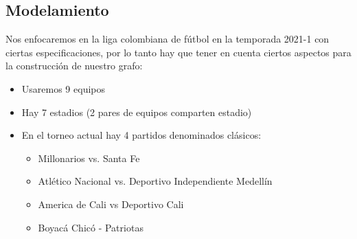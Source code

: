\documentclass[11pt]{article}
\begin{document}
\begin{multicols}{2}
        \section{Modelamiento}
            Nos enfocaremos en la liga colombiana de fútbol en la temporada 2021-1 con ciertas especificaciones, por lo tanto hay que 
            tener en cuenta ciertos aspectos para la construcción de nuestro grafo:
            \begin{itemize}
                \item  Usaremos 9 equipos
                \item  Hay 7 estadios (2 pares de equipos comparten estadio)
                \item  En el torneo actual hay 4 partidos denominados clásicos:
                \begin{itemize}
                    \item  Millonarios vs. Santa Fe
                    \item  Atlético Nacional vs. Deportivo Independiente Medellín
                    \item America de Cali vs Deportivo Cali
                    \item  Boyacá Chicó - Patriotas
                \end{itemize}
            \end{itemize}


\end{multicols}
\end{document}
